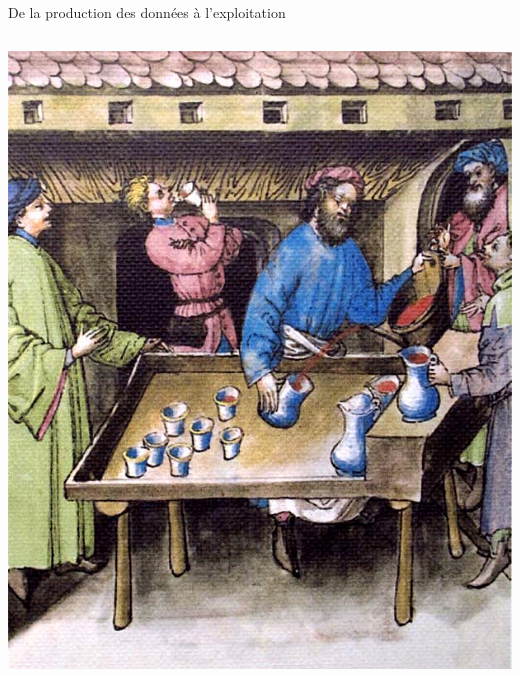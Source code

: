 \documentclass{beamer}
\begin{document}
\begin{frame}{De la production des données à l'exploitation}
\begin{columns}[T]
\begin{column}{0.38\textwidth}
		\includegraphics[width=\textwidth]{img/vin2.jpg}
		
	\end{column}
		
	\end{columns}
	
\end{frame}

\end{document}
